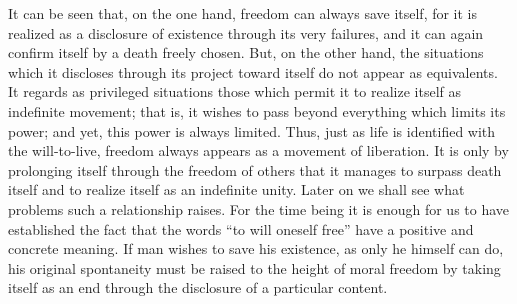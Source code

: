 \documentclass[11pt]{article}
\begin{document}
It can be seen that, on the one hand, freedom can always save itself, for it is realized as a disclosure of existence through its very failures, and it can again confirm itself by a death freely chosen. But, on the other hand, the situations which it discloses through its project toward itself do not appear as equivalents. It regards as privileged situations those which permit it to realize itself as indefinite movement; that is, it wishes to pass beyond everything which limits its power; and yet, this power is always limited. Thus, just as life is identified with the will-to-live, freedom always appears as a movement of liberation. It is only by prolonging itself through the freedom of others that it manages to surpass death itself and to realize itself as an indefinite unity. Later on we shall see what problems such a relationship raises. For the time being it is enough for us to have established the fact that the words “to will oneself free” have a positive and concrete meaning. If man wishes to save his existence, as only he himself can do, his original spontaneity must be raised to the height of moral freedom by taking itself as an end through the disclosure of a particular content.
\end{document}
